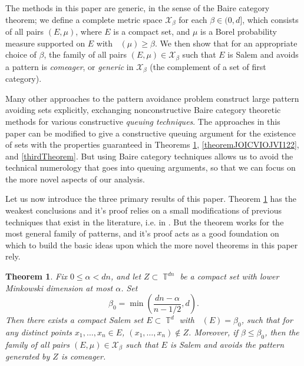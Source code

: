 \documentclass[dvipsnames,letterpaper,12pt]{article}
\numberwithin{equation}{section}
\DeclareMathOperator{\fordim}{\dim_{\mathbb{F}}}
\DeclareMathOperator{\TT}{\mathbb{T}}
\newtheorem{theorem}{Theorem}
\numberwithin{theorem}{section}
\begin{document}
The methods in this paper are generic, in the sense of the Baire category theorem; we define a complete metric space $\mathcal{X}_\beta$ for each $\beta \in (0,d]$, which consists of all pairs $(E,\mu)$, where $E$ is a compact set, and $\mu$ is a Borel probability measure supported on $E$ with $\fordim(\mu) \geq \beta$. We then show that for an appropriate choice of $\beta$, the family of all pairs $(E,\mu) \in \mathcal{X}_\beta$ such that $E$ is Salem and avoids a pattern is \emph{comeager}, or \emph{generic} in $\mathcal{X}_\beta$ (the complement of a set of first category).

Many other approaches \cite{OurPaper,PramanikFraser,Keleti} to the pattern avoidance problem construct large pattern avoiding sets explicitly, exchanging nonconstructive Baire category theoretic methods for various constructive \emph{queuing techniques}. The approaches in this paper can be modified to give a constructive queuing argument for the existence of sets with the properties guaranteed in Theorems \ref{maintheorem}, \ref{theoremJOICVIOJVI122}, and \ref{thirdTheorem}. But using Baire category techniques allows us to avoid the technical numerology that goes into queuing arguments, so that we can focus on the more novel aspects of our analysis.



Let us now introduce the three primary results of this paper. Theorem \ref{maintheorem} has the weakest conclusions and it's proof relies on a small modifications of previous techniques that exist in the literature, i.e. in \cite{Korner1}. But the theorem works for the most general family of patterns, and it's proof acts as a good foundation on which to build the basic ideas upon which the more novel theorems in this paper rely.

\begin{theorem} \label{maintheorem}
    Fix $0 \leq \alpha < dn$, and let $Z \subset \TT^{dn}$ be a compact set with lower Minkowski dimension at most $\alpha$. Set
    \[ \beta_0 = \min \left( \frac{dn - \alpha}{n-1/2}, d \right). \]
    Then there exists a compact Salem set $E \subset \TT^d$ with $\fordim(E) = \beta_0$, such that for any distinct points $x_1, \dots, x_n \in E$, $(x_1, \dots, x_n) \not \in Z$. Moreover, if $\beta \leq \beta_0$, then the family of all pairs $(E,\mu) \in \mathcal{X}_\beta$ such that $E$ is Salem and avoids the pattern generated by $Z$ is comeager.
\end{theorem}
\end{document}
